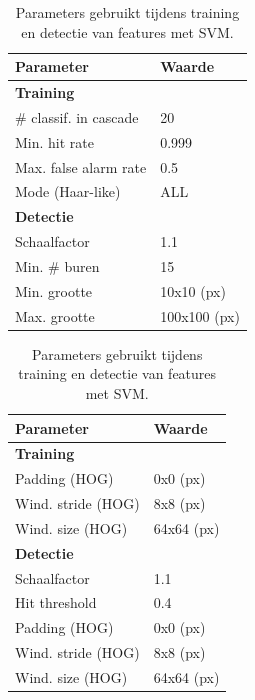 \begin{table}

\parbox{.45\linewidth}{
	\centering
  	\begin{tabular}{@{}ll@{}} \toprule
    Parameter & Waarde\\ \midrule
    \textbf{Training} & \\ 
    \# classif. in cascade & 20 \\
    Min. hit rate & 0.999 \\
    Max. false alarm rate & 0.5 \\
    Mode (Haar-like) & ALL \\ \midrule
    \textbf{Detectie} & \\ %
    Schaalfactor & 1.1 \\
    Min. \# buren & 15 \\
    Min. grootte & 10x10 (px) \\
    Max. grootte & 100x100 (px) \\ \bottomrule
  \end{tabular}
  \caption{Parameters gebruikt tijdens training en detectie van features met cascade classificatie.}
  \label{tab:param_ccla}
}
\hfill
\parbox{.45\linewidth}{
	\centering
  	\begin{tabular}{@{}ll@{}} \toprule
    Parameter & Waarde\\ \midrule
    \textbf{Training} & \\ 
    Padding (HOG) & 0x0 (px) \\
    Wind. stride (HOG) & 8x8 (px) \\
    Wind. size (HOG) & 64x64 (px) \\ \midrule
    \textbf{Detectie} & \\ %
	Schaalfactor & 1.1 \\
	Hit threshold & 0.4 \\
    Padding (HOG) & 0x0 (px) \\
    Wind. stride (HOG) & 8x8 (px) \\
    Wind. size (HOG) & 64x64 (px) \\ \bottomrule
  \end{tabular}
  \caption{Parameters gebruikt tijdens training en detectie van features met SVM.}
  \label{tab:param_svm}
}
\end{table}


